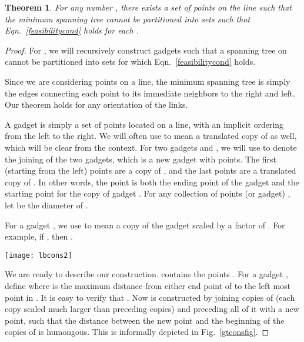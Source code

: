 \documentclass[11pt]{amsart}
\newcounter{foo}
\newtheorem{theorem}[foo]{Theorem}
\begin{document}
\begin{theorem}
For any number , there exists a set of points on the line such that the minimum spanning tree  cannot be 
partitioned into  sets  such that Eqn.~\ref{feasibilitycond} holds for each .
\end{theorem}
\begin{proof}
For , we will recursively construct gadgets  such that a spanning tree on  cannot be partitioned into 
sets for which Eqn.~\ref{feasibilitycond} holds. 

Since we are considering points on a line, the minimum spanning tree is simply
the edges connecting each point to its immediate neighbors to the right and left. Our theorem holds
for any orientation of the links.

A gadget  is simply a set of points located on a line, with an implicit ordering from the left to the right. We will often use  to mean a translated copy
of  as well, which will be clear from the context.
For two gadgets  and , we will use 
to denote the joining of the two gadgets, which is a new gadget with  points. The first (starting from the left)  points
are a copy of , and the last  points are a translated copy of . In other words, the  point is both
the ending point of the gadget  and the starting point for the copy of gadget . For any collection
of points (or gadget) , let  be the diameter of .

For a gadget , we use  to mean a copy of the gadget scaled by a factor of . For example,
if , then .


\begin{figure*}
\begin{center}
\texttt{[image: lbcons2]}
\caption{Construction of  from copies of . We join a number of copies of , each succeeding copy
scaled must larger than all the copies before it combined. All this is preceded by a huge new link between points  and  ( is very large)}
\label{gtconsfig}
\end{center}
\end{figure*}


We are ready to describe our construction.  contains the points .
For a gadget , define  where
 is the maximum distance from either end point of  to the left most point in . 
It is easy to verify that .
Now  is constructed by joining copies of  (each copy scaled much larger than preceding copies) and preceding all of it with a new point, such that
the distance between the new point and the beginning of the copies of  is humongous. This
is informally depicted in Fig.~\ref{gtconsfig}. 


\end{proof}
\end{document}
